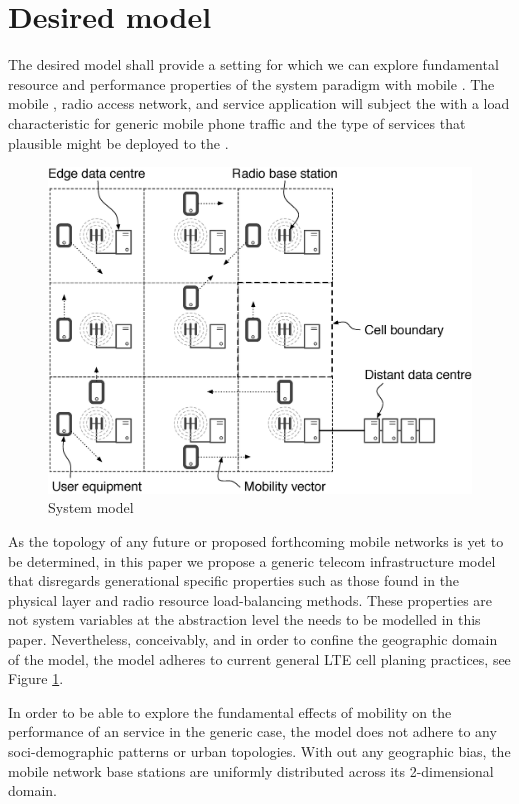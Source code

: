 \section{Desired model}

The desired model shall provide a setting for which we can explore fundamental resource and performance properties of the \xcloud{} system paradigm with mobile \ues{}. The mobile \ues{}, radio access network, and service application will subject the \dcs{} with a load characteristic for generic mobile phone traffic and the type of services that plausible might be deployed to the \xcloud{}.

\begin{figure}[tb]
	\centering
	\includegraphics[width=\linewidth]{fig_system_model.eps} 
	\caption{System model}
	\label{fig:system_model}
\end{figure}

As the topology of any future \xcloud{} or proposed forthcoming mobile networks is yet to be determined, in this paper we propose a generic telecom infrastructure model that disregards generational specific properties such as those found in the physical layer and radio resource load-balancing methods. These properties are not system variables at the abstraction level the \xcloud needs to be modelled in this paper. Nevertheless, conceivably, and in order to confine the geographic domain of the model, the model adheres to current general LTE cell planing practices, see Figure \ref{fig:system_model}.

In order to be able to explore the fundamental effects of mobility on the performance of an \xcloud service in the generic case, the model does not adhere to any soci-demographic patterns or urban topologies. With out any geographic bias, the mobile network base stations are uniformly distributed across its 2-dimensional domain.

